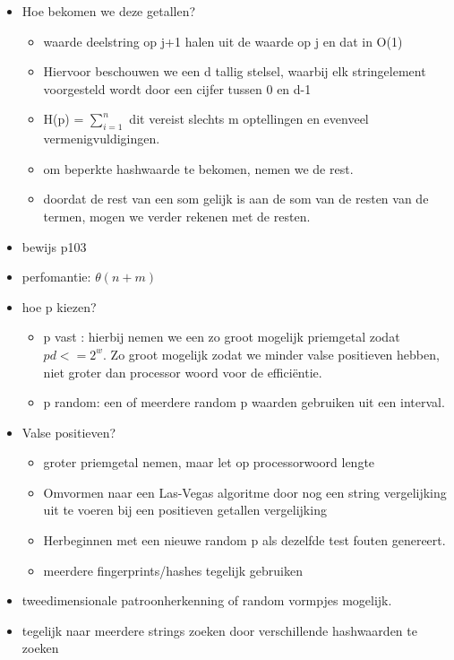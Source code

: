 \begin{itemize}
\item Hoe bekomen we deze getallen? 
\begin{itemize}
\item waarde deelstring op j+1 halen uit de waarde op j en dat in O(1)
\item Hiervoor beschouwen we een d tallig stelsel, waarbij elk stringelement voorgesteld wordt door een cijfer tussen 0 en d-1
\item H(p) = $\sum\limits_{i=1}^n$ dit vereist slechts m optellingen en evenveel vermenigvuldigingen. 
\item om beperkte hashwaarde te bekomen, nemen we de rest. 
\item doordat de rest van een som gelijk is aan de som van de resten van de termen, mogen we verder rekenen met de resten.
\end{itemize}
\item bewijs p103
\item perfomantie: $\theta(n+m)$
\item hoe p kiezen?
\begin{itemize}
\item p vast : hierbij nemen we een zo groot mogelijk priemgetal zodat $pd <= 2 ^w$.
Zo groot mogelijk zodat we minder valse positieven hebben, niet groter dan processor woord voor de effici\"entie.
\item p random: een of meerdere random p waarden gebruiken uit een interval.
\end{itemize}
\item Valse positieven?
\begin{itemize}
\item groter priemgetal nemen, maar let op processorwoord lengte
\item Omvormen naar een Las-Vegas algoritme door nog een string vergelijking uit te voeren bij een positieven getallen vergelijking
\item Herbeginnen met een nieuwe random p als dezelfde test fouten genereert.
\item meerdere fingerprints/hashes tegelijk gebruiken
\end{itemize}
\item tweedimensionale patroonherkenning of random vormpjes mogelijk.
\item tegelijk naar meerdere strings zoeken door verschillende hashwaarden te zoeken
\end{itemize}

